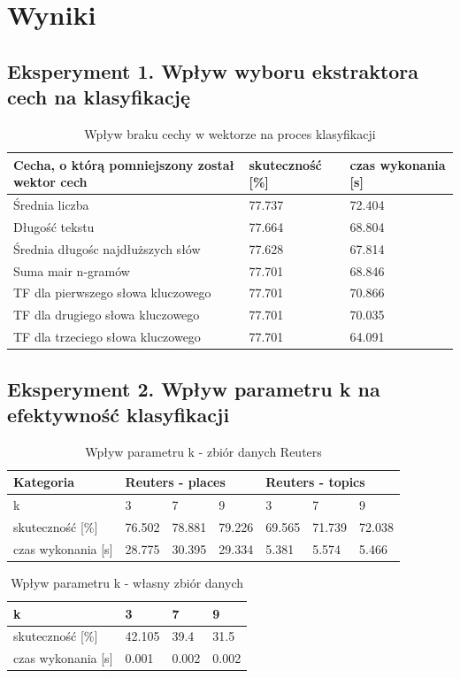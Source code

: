 \documentclass{classrep}
\begin{document}
\newpage
\section{Wyniki}
\subsection{Eksperyment 1. Wpływ wyboru ekstraktora cech na klasyfikację}
\begin{table}[H]
	\caption{Wpływ braku cechy w wektorze na proces klasyfikacji}
	\begin{tabular}{l|l|l}
		Cecha, o którą pomniejszony został wektor cech& skuteczność [\%]& czas wykonania [s]\\
		\hline
		Średnia liczba &77.737&72.404\\
		Długość tekstu &77.664&68.804\\
		Średnia długośc najdłuższych słów &77.628&67.814\\
		Suma mair n-gramów &77.701&68.846\\
		TF dla pierwszego słowa kluczowego &77.701&70.866\\
		TF dla drugiego słowa kluczowego &77.701&70.035\\
		TF dla trzeciego słowa kluczowego &77.701&64.091\\
	\end{tabular}
\end{table}

\subsection{Eksperyment 2. Wpływ parametru k na efektywność klasyfikacji} 
\begin{table}[H]
	\caption{Wpływ parametru k - zbiór danych Reuters}
	\begin{tabular}{l|l|l|l|l|l|l}
		Kategoria& \multicolumn{3}{|l}{ Reuters - places} 	& \multicolumn{3}{|l}{ Reuters - topics}\\
		\hline
		k& 3 & 7 & 9 & 3 & 7 & 9\\
		\hline
		skuteczność [\%]   &76.502&78.881&79.226&69.565&71.739& 72.038\\
		czas wykonania [s] &28.775&30.395&29.334&5.381&5.574&5.466\\
	\end{tabular}
\end{table}
\begin{table}[H]
	\centering
	\caption{Wpływ parametru k - własny zbiór danych}
	\begin{tabular}{l|l|l|l}
		k& 3 & 7 & 9 \\
		\hline
		skuteczność [\%]   &42.105&39.4&31.5\\
		czas wykonania [s] &0.001&0.002&0.002\\
	\end{tabular}
\end{table}
\end{document}

